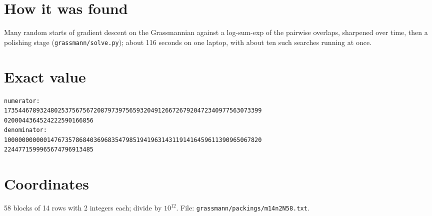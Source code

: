 \documentclass[11pt,a4paper]{article}
\begin{document}
\section{How it was found}
Many random starts of gradient descent on the Grassmannian against a log-sum-exp of the pairwise overlaps, sharpened over time, then a polishing stage (\texttt{grassmann/solve.py}); about 116 seconds on one laptop, with about ten such searches running at once.


\appendix
\section{Exact value}
{\small
\begin{verbatim}
numerator:
173544678932480253756756720879739756593204912667267920472340977563073399
0200044364524222590166856
denominator:
100000000000147673578684036968354798519419631431191416459611390965067820
2244771599965674796913485
\end{verbatim}}

\section{Coordinates}
58 blocks of 14 rows with 2 integers each; divide by $10^{12}$. File: \texttt{grassmann/packings/m14n2N58.txt}.
{\tiny
\begin{multicols}{4}
\end{multicols}}
\end{document}
